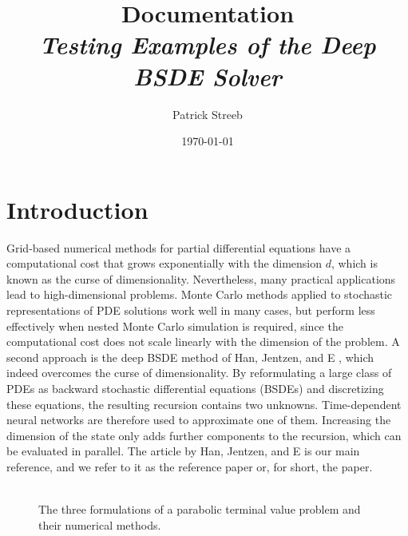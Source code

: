 ﻿\documentclass[10pt,a4paper]{article}
\title{Documentation \\
\emph{Testing Examples of the Deep BSDE Solver}}
\author{Patrick Streeb}
\date{\today}
\begin{document}
\onehalfspacing
\maketitle
\tableofcontents

\section{Introduction}
\label{sec:summary}
Grid-based numerical methods for partial differential equations have a computational cost that grows exponentially with the dimension $d$, which is known as the curse of dimensionality. Nevertheless, many practical applications lead to high-dimensional problems. Monte Carlo methods applied to stochastic representations of PDE solutions work well in many cases, but perform less effectively when nested Monte Carlo simulation is required, since the computational cost does not scale linearly with the dimension of the problem. A second approach is the deep BSDE method of Han, Jentzen, and E \cite{Han2018}, which indeed overcomes the curse of dimensionality. By reformulating a large class of PDEs as backward stochastic differential equations (BSDEs) and discretizing these equations, the resulting recursion contains two unknowns. Time-dependent neural networks are therefore used to approximate one of them. Increasing the dimension of the state only adds further components to the recursion, which can be evaluated in parallel. The article by Han, Jentzen, and E \cite{Han2018} is our main reference, and we refer to it as the reference paper or, for short, the paper. \\ \
\begin{figure}[htb]
\centering
{}
\caption{The three formulations of a parabolic terminal value problem
and their numerical methods.}
\label{fig:route}
\end{figure}
\end{document}
